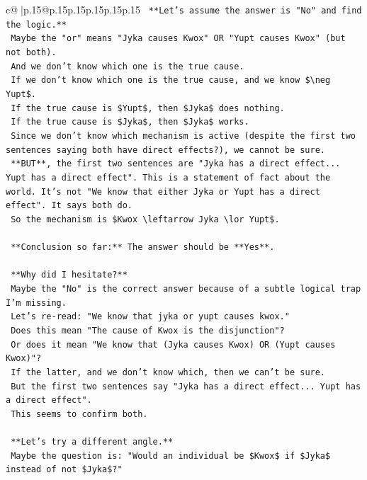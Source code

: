 \documentclass{article}
\begin{document}
{\begin{supertabular}{c@{$\;$}|p{.15\linewidth}@{}p{.15\linewidth}p{.15\linewidth}p{.15\linewidth}p{.15\linewidth}p{.15\linewidth}}
{{{\texttt{    **Let's assume the answer is "No" and find the logic.**} \\
\texttt{    Maybe the "or" means "Jyka causes Kwox" OR "Yupt causes Kwox" (but not both).} \\
\texttt{    And we don't know which one is the true cause.} \\
\texttt{    If we don't know which one is the true cause, and we know \$\textbackslash{}neg Yupt\$.} \\
\texttt{    If the true cause is \$Yupt\$, then \$Jyka\$ does nothing.} \\
\texttt{    If the true cause is \$Jyka\$, then \$Jyka\$ works.} \\
\texttt{    Since we don't know which mechanism is active (despite the first two sentences saying both have direct effects?), we cannot be sure.} \\
\texttt{    **BUT**, the first two sentences are "Jyka has a direct effect... Yupt has a direct effect". This is a statement of fact about the world. It's not "We know that either Jyka or Yupt has a direct effect". It says both do.} \\
\texttt{    So the mechanism is \$Kwox \textbackslash{}leftarrow Jyka \textbackslash{}lor Yupt\$.} \\
\\ 
\texttt{    **Conclusion so far:** The answer should be **Yes**.} \\
\\ 
\texttt{    **Why did I hesitate?**} \\
\texttt{    Maybe the "No" is the correct answer because of a subtle logical trap I'm missing.} \\
\texttt{    Let's re{-}read: "We know that jyka or yupt causes kwox."} \\
\texttt{    Does this mean "The cause of Kwox is the disjunction"?} \\
\texttt{    Or does it mean "We know that (Jyka causes Kwox) OR (Yupt causes Kwox)"?} \\
\texttt{    If the latter, and we don't know which, then we can't be sure.} \\
\texttt{    But the first two sentences say "Jyka has a direct effect... Yupt has a direct effect".} \\
\texttt{    This seems to confirm both.} \\
\\ 
\texttt{    **Let's try a different angle.**} \\
\texttt{    Maybe the question is: "Would an individual be \$Kwox\$ if \$Jyka\$ instead of not \$Jyka\$?"} \\
}}}
\end{supertabular}}
\end{document}
